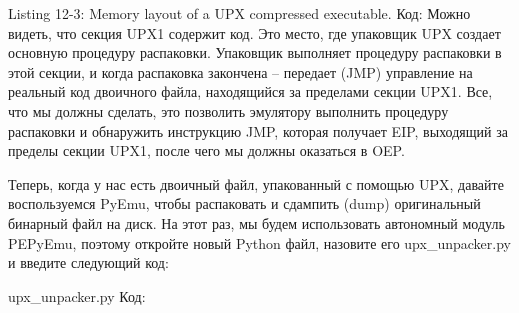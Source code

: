 \documentclass[12pt]{book}
\begin{document}
Listing 12-3: Memory layout of a UPX compressed executable.
Код:
Можно видеть, что секция UPX1 содержит код. Это место, где упаковщик UPX создает основную процедуру распаковки. Упаковщик выполняет процедуру распаковки в этой секции, и когда распаковка закончена – передает (JMP) управление на реальный код двоичного файла, находящийся за пределами секции UPX1. Все, что мы должны сделать, это позволить эмулятору выполнить процедуру распаковки и обнаружить инструкцию JMP, которая получает EIP, выходящий за пределы секции UPX1, после чего мы должны оказаться в OEP.

Теперь, когда у нас есть двоичный файл, упакованный с помощью UPX, давайте воспользуемся PyEmu, чтобы распаковать и сдампить (dump) оригинальный бинарный файл на диск. На этот раз, мы будем использовать автономный модуль PEPyEmu, поэтому откройте новый Python файл, назовите его upx\_unpacker.py и введите следующий код:

upx\_unpacker.py
Код:







\end{document}
